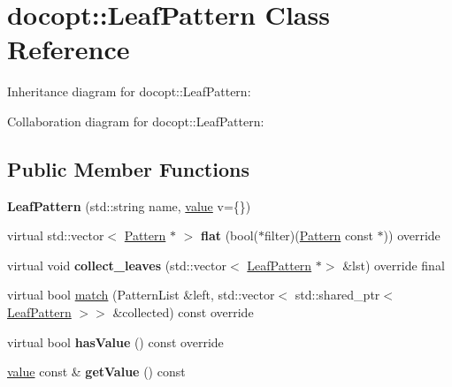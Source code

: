 \hypertarget{classdocopt_1_1LeafPattern}{}\section{docopt\+:\+:Leaf\+Pattern Class Reference}
\label{classdocopt_1_1LeafPattern}


Inheritance diagram for docopt\+:\+:Leaf\+Pattern\+:


Collaboration diagram for docopt\+:\+:Leaf\+Pattern\+:
\subsection*{Public Member Functions}
\begin{DoxyCompactItemize}
\item 
\mbox{\label{classdocopt_1_1LeafPattern_af9d71f5fdb74eddcb3150f9baaa815ce}} 
{\bfseries Leaf\+Pattern} (std\+::string name, \hyperlink{structdocopt_1_1value}{value} v=\{\})
\item 
\mbox{\label{classdocopt_1_1LeafPattern_a1bcf7e63fb2cac3e95999cb3ebd2282e}} 
virtual std\+::vector$<$ \hyperlink{classdocopt_1_1Pattern}{Pattern} $\ast$ $>$ {\bfseries flat} (bool($\ast$filter)(\hyperlink{classdocopt_1_1Pattern}{Pattern} const $\ast$)) override
\item 
\mbox{\label{classdocopt_1_1LeafPattern_afe958fb191f74b453d8fa6ef588ae8f2}} 
virtual void {\bfseries collect\+\_\+leaves} (std\+::vector$<$ \hyperlink{classdocopt_1_1LeafPattern}{Leaf\+Pattern} $\ast$$>$ \&lst) override final
\item 
virtual bool \hyperlink{classdocopt_1_1LeafPattern_a634a7028ce2c71ebb89586088034b7e2}{match} (Pattern\+List \&left, std\+::vector$<$ std\+::shared\+\_\+ptr$<$ \hyperlink{classdocopt_1_1LeafPattern}{Leaf\+Pattern} $>$$>$ \&collected) const override
\item 
\mbox{\label{classdocopt_1_1LeafPattern_aa410655d7bc5b2fa6676569f70065535}} 
virtual bool {\bfseries has\+Value} () const override
\item 
\mbox{\label{classdocopt_1_1LeafPattern_aa98d57a742abf8f194fe483e35ce5b67}} 
\hyperlink{structdocopt_1_1value}{value} const  \& {\bfseries get\+Value} () const

\end{DoxyCompactItemize}
